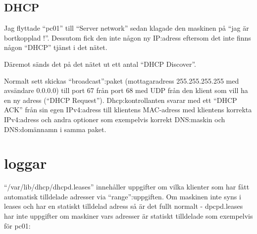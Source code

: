 \documentclass[swedish,10pt,a4paper]{report}
\begin{document}
\section{DHCP}\label{sec:dhcp_konf}

Jag flyttade ``pc01'' till  ``Server network'' sedan klagade den maskinen på ``jag är bortkopplad !''.
Dessutom fick den inte någon ny IP:adress eftersom det inte finns någon ``DHCP'' tjänst i det nätet.

Däremot sänds det på det nätet ut ett antal ``DHCP Discover''.

Normalt sett skickas ``broadcast'':paket (mottagaradress 255.255.255.255 med avsändare 0.0.0.0) till port 67 från port 68 med UDP från
den klient som vill ha en ny adress (``DHCP Request''). Dhcp:kontrollanten svarar med ett ``DHCP ACK'' från sin
egen IPv4:adress till klientens MAC-adress med klientens korrekta IPv4:adress och andra optioner som exempelvis
korrekt DNS:maskin och DNS:domännamn i samma paket.

\chapter{loggar}

``/var/lib/dhcp/dhcpd.leases'' innehåller uppgifter om vilka klienter som har fått
automatisk tilldelade adresser via ``range'':uppgiften. Om maskinen inte syns i leases och
har en statiskt tilldelad adress så är det fullt normalt - dpcpd.leases har inte
uppgifter om maskiner vars adresser är statiskt tilldelade
som exempelvis för pc01:


\end{document}
